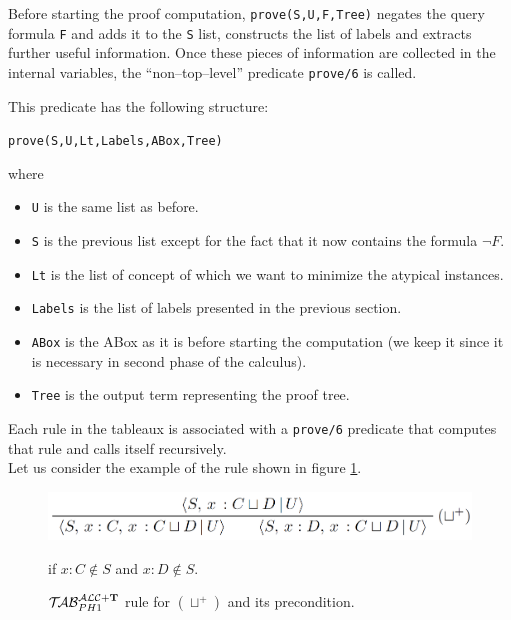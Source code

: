 \documentclass[a4paper, 11pt, oneside]{duthesis}
\newcommand{\tip}{{\bf T}}
\newcommand{\primo}{\mathrel{{\mathcal{T}\!\mathcal{AB}}}_{PH 1}^{\mathcal{ALC}+\mbox{\scriptsize $\tip$}}}
\begin{document}
Before starting the proof computation, \texttt{prove(S,U,F,Tree)} negates the query formula \texttt{F} and adds it to the \texttt{S} list, constructs the list of labels and extracts further useful information.
Once these pieces of information are collected in the internal variables, the ``non--top--level'' predicate \texttt{prove/6} is called.

\newpage

This predicate has the following structure:

\begin{center}\texttt{prove(S,U,Lt,Labels,ABox,Tree)}\end{center}
where

\begin{itemize}
\item \texttt{U} is the same list as before.
\item \texttt{S} is the previous list except for the fact that it now contains the formula $\neg F$.
\item \texttt{Lt} is the list of concept of which we want to minimize the atypical instances.
\item \texttt{Labels} is the list of labels presented in the previous section.
\item \texttt{ABox} is the ABox as it is before starting the computation (we keep it since it is necessary in second phase of the calculus).
\item \texttt{Tree} is the output term representing the proof tree.
\end{itemize}
Each rule in the tableaux is associated with a \texttt{prove/6} predicate that computes that rule and calls itself recursively.\\

Let us consider the example of the rule shown in figure \ref{fig_union_rule}.

\begin{figure}[htp]
\begin{center}\includegraphics[scale=0.25]{img/union_rule.png}\end{center} %
	\begin{flushright}if $x : C \notin S$ and $x : D \notin S$.\\\end{flushright}
	\caption{$\primo$ rule for $(\sqcup^+)$ and its precondition.}
	\label{fig_union_rule}
\end{figure}
\end{document}
